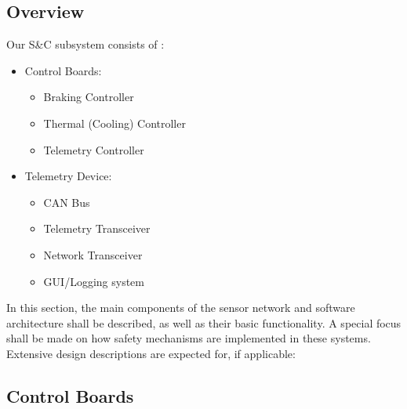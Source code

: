 \subsection{Overview}

Our S\&C subsystem consists of :
\begin{itemize}
    \item Control Boards: 
    \begin{itemize}
            \item Braking Controller
            \item Thermal (Cooling) Controller
            \item Telemetry Controller
    \end{itemize}

    \item Telemetry Device: 
    \begin{itemize}
            \item CAN Bus
            \item Telemetry Transceiver
            \item Network Transceiver
            \item GUI/Logging system
    \end{itemize}
\end{itemize}
In this section, the main components of the sensor network and software architecture shall be described, as well as their basic functionality. A special focus shall be made on how safety mechanisms are implemented in these systems. Extensive design descriptions are expected for, if applicable:

\subsection{Control Boards}

